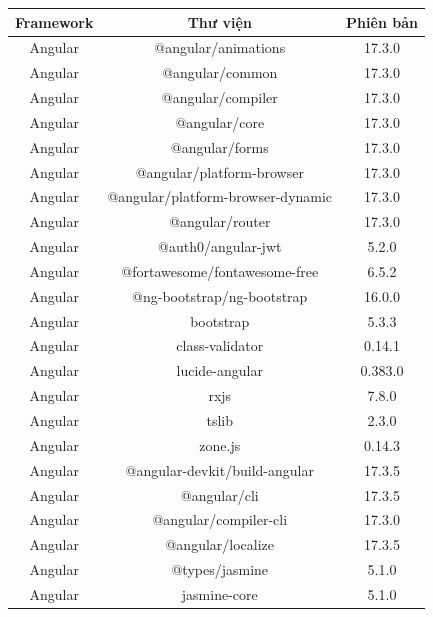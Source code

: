 \documentclass[../DoAn.tex]{subfiles}
\begin{document}
    \begin{table}[H]
    \centering{}
        \begin{tabular}{|c|c|c|}
        \hline
        \textbf{Framework} & \textbf{Thư viện} & \textbf{Phiên bản} \\
        \hline
        Angular & @angular/animations & 17.3.0 \\
        \hline
        Angular & @angular/common & 17.3.0 \\
        \hline
        Angular & @angular/compiler & 17.3.0 \\
        \hline
        Angular & @angular/core & 17.3.0 \\
        \hline
        Angular & @angular/forms & 17.3.0 \\
        \hline
        Angular & @angular/platform-browser & 17.3.0 \\
        \hline
        Angular & @angular/platform-browser-dynamic & 17.3.0 \\
        \hline
        Angular & @angular/router & 17.3.0 \\
        \hline
        Angular & @auth0/angular-jwt & 5.2.0 \\
        \hline
        Angular & @fortawesome/fontawesome-free & 6.5.2 \\
        \hline
        Angular & @ng-bootstrap/ng-bootstrap & 16.0.0 \\
        \hline
        Angular & bootstrap & 5.3.3 \\
        \hline
        Angular & class-validator & 0.14.1 \\
        \hline
        Angular & lucide-angular & 0.383.0 \\
        \hline
        Angular & rxjs & 7.8.0 \\
        \hline
        Angular & tslib & 2.3.0 \\
        \hline
        Angular & zone.js & 0.14.3 \\
        \hline
        Angular & @angular-devkit/build-angular & 17.3.5 \\
        \hline
        Angular & @angular/cli & 17.3.5 \\
        \hline
        Angular & @angular/compiler-cli & 17.3.0 \\
        \hline
        Angular & @angular/localize & 17.3.5 \\
        \hline
        Angular & @types/jasmine & 5.1.0 \\
        \hline
        Angular & jasmine-core & 5.1.0 \\

\end{tabular}
\end{table}
\end{document}
